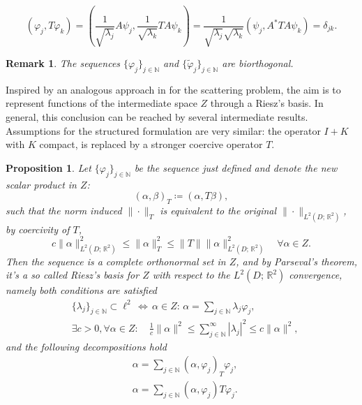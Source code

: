 \documentclass[10pt, a4paper, twoside, openright]{book}
\theoremstyle{definition}
\theoremstyle{plain}
\theoremstyle{plain}
\theoremstyle{plain}
\newtheorem{proposition}[subsection]{Proposition}
\theoremstyle{plain}
\newtheorem{remark}[subsection]{Remark}
\theoremstyle{plain}
\theoremstyle{plain}
\theoremstyle{plain}
\theoremstyle{plain}
\let\phi\varphi
\begin{document}
\begin{equation}
 (\phi_j, T\phi_k) =  ( \frac{1}{\sqrt{\lambda_j}} A\psi_j, \frac{1}{\sqrt{\lambda_k}} TA\psi_k) = \frac{1}{\sqrt{\lambda_j}\sqrt{\lambda_k}}( \psi_j, A^*TA\psi_k) = \delta_{jk}.
\end{equation}
\begin{remark}
 The sequences $\{\phi_j\}_{j\in\mathbb{N}}$ and $\{\tilde{\phi}_j\}_{j\in\mathbb{N}}$ are biorthogonal.
\end{remark}
Inspired by an analogous approach in \cite{kirsch:shape-1998} for the scattering problem, the aim is to represent functions of the intermediate space $Z$ through a Riesz's basis.
In general, this conclusion can be reached by several intermediate results. Assumptions for the structured formulation are very similar: the operator $I+K$ with $K$ compact, is replaced by a stronger coercive operator $T$.
\begin{proposition}
 Let $\{\phi_j\}_{j\in\mathbb{N}}$ be the sequence just defined and denote the new scalar product in $Z$:
 \begin{equation}
   ( \alpha, \beta )_T \coloneqq ( \alpha , T\beta),
 \end{equation}
 such that the norm induced $\|\cdot\|_T$ is equivalent to the original $\|\cdot\|_{L^2(D;\,\mathbb{R}^2)}$, by coercivity of $T$,
  \begin{equation}
   c\|\alpha\|_{L^2(D;\,\mathbb{R}^2)}^2\leq \|\alpha\|_T^2 \leq \|T\|\|\alpha\|_{L^2(D;\,\mathbb{R}^2)}^2\quad \forall \alpha\in Z.
  \end{equation}
 Then the sequence is a complete orthonormal set in $Z$, and by Parseval's theorem, it's a so called Riesz's basis for $Z$ with respect to the $L^2(D;\,\mathbb{R}^2)$ convergence, namely both conditions are satisfied
 \begin{align}
 &\{\lambda_j\}_{j \in \mathbb{N}} \subset \ell^2 \,\Leftrightarrow \,\alpha \in Z:\,\alpha = \sum_{j \in \mathbb{N}}\lambda_j \phi_j, \\
 & \exists c>0, \forall \alpha \in Z: \quad \frac{1}{c}\|\alpha\|^2 \leq \sum_{j\in\mathbb{N}}^\infty|\lambda_j|^2  \leq c \|\alpha\|^2,
 \end{align}
 and the following decompositions hold
 \begin{align}
  & \alpha = \sum_{j \in \mathbb{N}}(\alpha,\phi_j)_T \phi_j,\\
  & \alpha = \sum_{j \in \mathbb{N}}(\alpha,\phi_j) T\phi_j. 
 \end{align}
\end{proposition}
\end{document}
